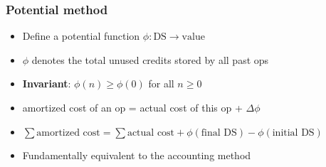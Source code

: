 \documentclass[10pt, landscape]{article}
\begin{document}
\subsubsection{Potential method}

\begin{itemize}
	\item Define a potential function $\phi : \text{DS} \rightarrow \text{value}$
	\item $\phi$ denotes the total unused credits stored by all past ops
	\item \textbf{Invariant}: $\phi(n) \ge \phi(0)$ for all $n \ge 0$
	\item amortized cost of an op = actual cost of this op + $\Delta \phi$
	\item $\sum{\text{amortized cost}} = \sum{\text{actual cost}} + \phi(\text{final DS}) - \phi(\text{initial DS})$
	\item Fundamentally equivalent to the accounting method
\end{itemize}
\end{document}
